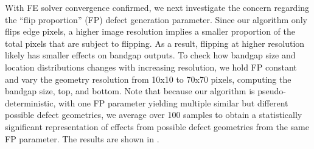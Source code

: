 \documentclass[preprint,review,12pt]{elsarticle}
\begin{document}
With FE solver convergence confirmed, we next investigate the concern regarding the ``flip proportion'' (FP) defect generation parameter. Since our algorithm only flips edge pixels, a higher image resolution implies a smaller proportion of the total pixels that are subject to flipping. As a result, flipping at higher resolution likely has smaller effects on bandgap outputs. To check how bandgap size and location distributions changes with increasing resolution, we hold FP constant and vary the geometry resolution from 10x10 to 70x70 pixels, computing the bandgap size, top, and bottom. Note that because our algorithm is pseudo-deterministic, with one FP parameter yielding multiple similar but different possible defect geometries, we average over 100 samples to obtain a statistically significant representation of effects from possible defect geometries from the same FP parameter. The results are shown in .

\end{document}
